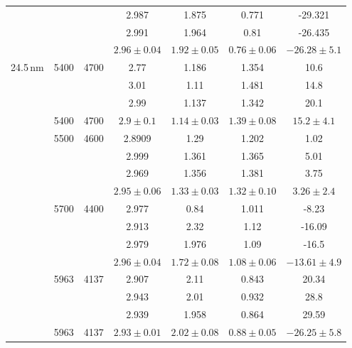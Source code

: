 \documentclass{article}
\begin{document}
\begin{table}
\begin{tabular}{|c|c|c|c|c|c|c|}
              &     &              & 2.987        & 1.875        & 0.771      & -29.321  \\
              &     &              & 2.991        & 1.964        & 0.81       & -26.435  \\
        \hline
              &     &              & $2.96 \pm 0.04$ & $1.92 \pm 0.05$ & $0.76 \pm 0.06$ & $-26.28\pm 5.1$ \\
      \hline
     24.5\,nm &5400 & 4700         & 2.77         & 1.186       & 1.354       & 10.6 \\
              &     &              & 3.01         & 1.11        & 1.481       & 14.8 \\
              &     &              & 2.99         & 1.137       & 1.342       & 20.1 \\
      \hline
              &5400 & 4700 & $2.9  \pm 0.1$  & $1.14 \pm 0.03$ & $1.39 \pm 0.08$ & $15.2 \pm 4.1$ \\
      \hline
              &5500 & 4600         & 2.8909       & 1.29        & 1.202      & 1.02 \\
              &     &              & 2.999        & 1.361       & 1.365      & 5.01 \\
              &     &              & 2.969        & 1.356       & 1.381      & 3.75 \\
     \hline
              &     &      & $2.95 \pm 0.06$ & $1.33 \pm 0.03$ & $1.32 \pm 0.10$ & $3.26 \pm 2.4$ \\
     \hline
              &5700 & 4400         & 2.977        & 0.84        & 1.011      & -8.23 \\
              &     &              & 2.913        & 2.32        & 1.12       & -16.09 \\
              &     &              & 2.979        & 1.976       & 1.09       & -16.5 \\
     \hline
              &     &     & $2.96 \pm 0.04$ & $1.72 \pm 0.08$ & $1.08 \pm 0.06$ & $-13.61\pm4.9$ \\
     \hline
              &5963 & 4137         & 2.907       &  2.11             & 0.843       & 20.34 \\
              &     &              & 2.943       &  2.01             & 0.932       & 28.8 \\
              &     &              & 2.939       & 1.958             & 0.864       & 29.59 \\
     \hline
              &5963 & 4137 & $2.93 \pm 0.01$ & $2.02 \pm 0.08$ & $0.88 \pm 0.05$ & $-26.25\pm5.8$ \\
       \hline
    \end{tabular}
    \label{Tab-1}
\end{table}
\end{document}
